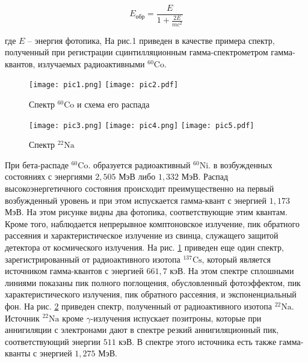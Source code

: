 \begin{equation}\label{eq::E_rev}
  E_{\text{обр}} = \frac{E}{1 + \frac{2 E}{m c^2}}
\end{equation}

где $E$ -- энергия фотопика, На рис.1 приведен в качестве примера спектр,
полученный при регистрации сцинтилляционным гамма-спектрометром гамма-квантов,
излучаемых радиоактивными ${}^{60}{\text{Co}}$.

\begin{figure}[h!]
  \centering
  \texttt{[image: pic1.png]}
  \texttt{[image: pic2.pdf]}
  \caption{Спектр ${}^{60}{\text{Co}}$ и схема его распада}
  \label{pic:Cobalt}
\end{figure}

\begin{figure}
  \centering
  \texttt{[image: pic3.png]}
  \texttt{[image: pic4.png]}
  \texttt{[image: pic5.pdf]}
  \caption{Спектр ${}^{22}{\text{Na}}$}
  \label{pic:Natrium}
\end{figure}

При бета-распаде ${}^{60}{\text{Co}}$. образуется радиоактивный
${}^{60}{\text{Ni}}$. в возбужденных состояниях с энергиями $2,505$ МэВ либо
$1,332$ МэВ. Распад высокоэнергетичного состояния происходит преимущественно на
первый возбужденный уровень и при этом испускается гамма-квант с энергией
$1,173$ МэВ. На этом рисунке видны два фотопика, соответствующие этим квантам.
Кроме того, наблюдается непрерывное комптоновское излучение, пик обратного
рассеяния и характеристическое излучение из свинца, служащего защитой детектора
от космического излучения. На рис. \ref{pic:Cobalt} приведен еще один спектр,
зарегистрированный от радиоактивного изотопа ${}^{137}{\text{Cs}}$, который
является источником гамма-квантов с энергией $661,7$ кэВ. На этом спектре
сплошными линиями показаны пик полного поглощения, обусловленный фотоэффектом,
пик характеристического излучения, пик обратного рассеяния, и экспоненциальный
фон. На рис. \ref{pic:Natrium} приведен спектр, полученный от радиоактивного
изотопа ${}^{22}{\text{Na}}$. Источник ${}^{22}{\text{Na}}$ кроме
$\gamma$-излучения испускает позитроны, которые при аннигиляции с электронами
дают в спектре резкий аннигиляционный пик, соответствующий энергии $511$ кэВ. В
спектре этого источника есть также гамма-кванты с энергией $1,275$ МэВ.
